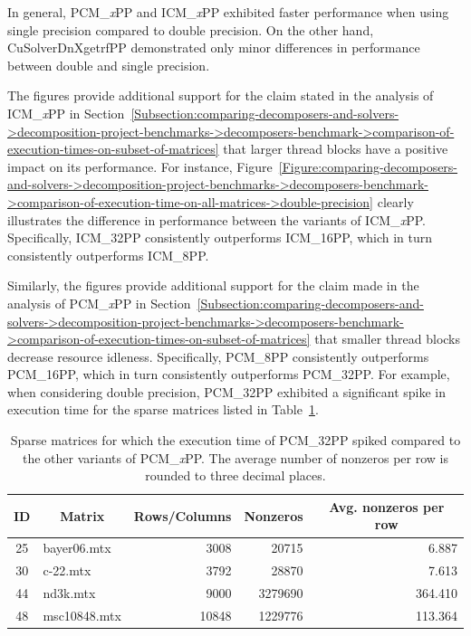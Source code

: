 In general, PCM\_\textit{x}PP and ICM\_\textit{x}PP exhibited faster performance when using single precision compared to double precision. On the other hand, CuSolverDnXgetrfPP demonstrated only minor differences in performance between double and single precision.

The figures provide additional support for the claim stated in the analysis of ICM\_\textit{x}PP in Section~\ref{Subsection:comparing-decomposers-and-solvers->decomposition-project-benchmarks->decomposers-benchmark->comparison-of-execution-times-on-subset-of-matrices} that larger thread blocks have a positive impact on its performance. For instance, Figure~\ref{Figure:comparing-decomposers-and-solvers->decomposition-project-benchmarks->decomposers-benchmark->comparison-of-execution-time-on-all-matrices->double-precision} clearly illustrates the difference in performance between the variants of ICM\_\textit{x}PP. Specifically, ICM\_32PP consistently outperforms ICM\_16PP, which in turn consistently outperforms ICM\_8PP.

Similarly, the figures provide additional support for the claim made in the analysis of PCM\_\textit{x}PP in Section~\ref{Subsection:comparing-decomposers-and-solvers->decomposition-project-benchmarks->decomposers-benchmark->comparison-of-execution-times-on-subset-of-matrices} that smaller thread blocks decrease resource idleness. Specifically, PCM\_8PP consistently outperforms PCM\_16PP, which in turn consistently outperforms PCM\_32PP. For example, when considering double precision, PCM\_32PP exhibited a significant spike in execution time for the sparse matrices listed in Table~\ref{Table:comparing-decomposers-and-solvers->decomposition-project-benchmarks->decomposers-benchmark->comparison-of-execution-time-on-all-matrices->sparse-matrices-that-execution-time-of-pcm32pp-spiked-on}.

\begin{table}[ht!]
	\centering
	\begin{tabular}{|c|l|r|r|r|}
		\hline
		\rowcolor[HTML]{C0C0C0} \textbf{ID} & \multicolumn{1}{|c|}{\textbf{Matrix}} & \multicolumn{1}{c|}{\textbf{Rows/Columns}} & \multicolumn{1}{c|}{\textbf{Nonzeros}} & \multicolumn{1}{c|}{\textbf{Avg. nonzeros per row}} \\ \hline
		25 & bayer06.mtx  &  3008 &   20715 &   6.887 \\
		30 & c-22.mtx     &  3792 &   28870 &   7.613 \\
		44 & nd3k.mtx     &  9000 & 3279690 & 364.410 \\
		48 & msc10848.mtx & 10848 & 1229776 & 113.364 \\ \hline
	\end{tabular}
	\caption{Sparse matrices for which the execution time of PCM\_32PP spiked compared to the other variants of PCM\_\textit{x}PP. The average number of nonzeros per row is rounded to three decimal places.}
	\label{Table:comparing-decomposers-and-solvers->decomposition-project-benchmarks->decomposers-benchmark->comparison-of-execution-time-on-all-matrices->sparse-matrices-that-execution-time-of-pcm32pp-spiked-on}
\end{table}

